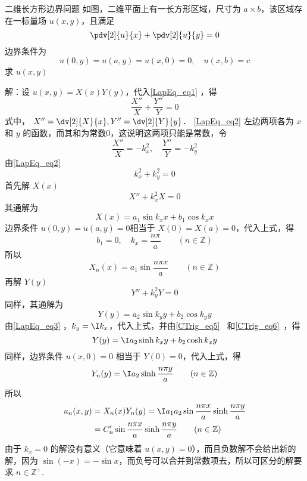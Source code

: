 \begin{example}{二维长方形边界问题}
如图，二维平面上有一长方形区域，尺寸为 $a\times b$，该区域存在一标量场 $u(x,y)$，且满足
\begin{equation}\label{LapEq_eq1}
\pdv[2]{u}{x}+\pdv[2]{u}{y}=0
\end{equation}
边界条件为
\begin{equation}
u(0,y)=u(a,y)=u(x,0)=0,\quad u(x,b)=c
\end{equation}
求 $u(x,y)$

解：设 $u(x,y)=X(x)Y(y)$，代入\autoref{LapEq_eq1} ，得
\begin{equation}\label{LapEq_eq2}
\frac{X''}{X}+\frac{Y''}{Y}=0
\end{equation}
式中， $X''=\dv[2]{X}{x},Y''=\dv[2]{Y}{y}$．
\autoref{LapEq_eq2} 左边两项各为 $x$ 和 $y$ 的函数，而其和为常数0，这说明这两项只能是常数，令
\begin{equation}
\frac{X''}{X}=-k_x^2,\quad \frac{Y''}{Y}=-k_y^2
\end{equation}
由\autoref{LapEq_eq2} 
\begin{equation}\label{LapEq_eq3}
k_x^2+k_y^2=0
\end{equation}
首先解 $X(x)$
\begin{equation}
X''+k_x^2X=0
\end{equation}
其通解为
\begin{equation}
X(x)=a_1\sin k_x x+b_1\cos k_x x
\end{equation}
边界条件 $u(0,y)=u(a,y)=0$相当于 $X(0)=X(a)=0$，代入上式，得
\begin{equation}
b_1=0,\quad k_x=\frac{n\pi}{a} \qquad (n\in \mathbb{Z})
\end{equation}
所以
\begin{equation}
X_n(x)=a_1\sin\frac{n\pi x}{a} \qquad (n\in \mathbb{Z})
\end{equation}
再解 $Y(y)$
\begin{equation}
Y''+k_y^2Y=0
\end{equation}
同样，其通解为
\begin{equation}
Y(y)=a_2\sin k_y y+b_2\cos k_y y
\end{equation}
由\autoref{LapEq_eq3} ，$k_y=\I k_x$，代入上式，并由\autoref{CTrig_eq5}~ 和\autoref{CTrig_eq6}~，得
\begin{equation}
Y(y)=\I a_2\sinh k_x y+b_2\cosh k_x y
\end{equation}
同样，边界条件 $u(x,0)=0$ 相当于 $Y(0)=0$，代入上式，得
\begin{equation}
Y_n(y)=\I a_2\sinh\frac{n\pi y}{a} \qquad (n\in \mathbb{Z})
\end{equation}
所以
\begin{equation}
\begin{aligned}
u_n(x,y)&=X_n(x)Y_n(y)=\I a_1a_2\sin\frac{n\pi x}{a}\sinh\frac{n\pi y}{a}\\
&=C'_n\sin\frac{n\pi x}{a}\sinh\frac{n\pi y}{a} \qquad (n\in\mathbb{Z})
\end{aligned}
\end{equation}
由于 $k_x=0$ 的解没有意义（它意味着 $u(x,y)=0$），而且负数解不会给出新的解，因为 $\sin(-x)=-\sin x$，而负号可以合并到常数项去，所以可区分的解要求 $n\in\mathbb{Z^+}$.


\end{example}
